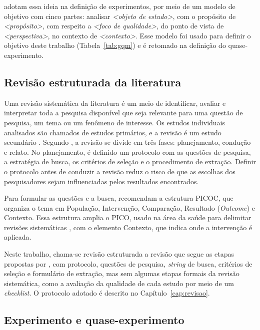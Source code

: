  adotam essa ideia na definição de experimentos, por meio de um modelo de objetivo com cinco partes: analisar \textit{<objeto de estudo>}, com o propósito de \textit{<propósito>}, com respeito a \textit{<foco de qualidade>}, do ponto de vista de \textit{<perspectiva>}, no contexto de \textit{<contexto>}. Esse modelo foi usado para definir o objetivo deste trabalho (Tabela~\ref{tab:gqm}) e é retomado na definição do quase-experimento.

\subsection{Revisão estruturada da literatura}
\label{sec:ref-rsl}

Uma revisão sistemática da literatura é um meio de identificar, avaliar e interpretar toda a pesquisa disponível que seja relevante para uma questão de pesquisa, um tema ou um fenômeno de interesse. Os estudos individuais analisados são chamados de estudos primários, e a revisão é um estudo secundário \cite{kitchenham2007}. Segundo , a revisão se divide em três fases: planejamento, condução e relato. No planejamento, é definido um protocolo com as questões de pesquisa, a estratégia de busca, os critérios de seleção e o procedimento de extração. Definir o protocolo antes de conduzir a revisão reduz o risco de que as escolhas dos pesquisadores sejam influenciadas pelos resultados encontrados.

Para formular as questões e a busca,  recomendam a estrutura PICOC, que organiza o tema em População, Intervenção, Comparação, Resultado (\textit{Outcome}) e Contexto. Essa estrutura amplia o PICO, usado na área da saúde para delimitar revisões sistemáticas \cite{pai2004}, com o elemento Contexto, que indica onde a intervenção é aplicada.

Neste trabalho, chama-se revisão estruturada a revisão que segue as etapas propostas por , com protocolo, questões de pesquisa, \textit{string} de busca, critérios de seleção e formulário de extração, mas sem algumas etapas formais da revisão sistemática, como a avaliação da qualidade de cada estudo por meio de um \textit{checklist}. O protocolo adotado é descrito no Capítulo~\ref{cap:revisao}.

\subsection{Experimento e quase-experimento}
\label{sec:ref-experimento}

